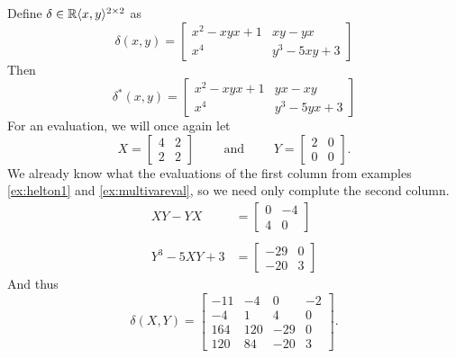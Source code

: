 \begin{example}
  Define \(\delta \in \mathbb{R} \langle x,y \rangle ^{2\times 2}\) as
  \[
    \delta(x,y) = \begin{bmatrix}
               x^2-xyx+1 & xy-yx \\
               x^4 & y^3-5xy+3
        \end{bmatrix}
  \]
  Then
  \[
    \delta^*(x,y) = \begin{bmatrix}
               x^2-xyx+1 & yx-xy \\
               x^4 & y^3-5yx+3
        \end{bmatrix}
  \]
  For an evaluation, we will once again let
  \[
    X = \begin{bmatrix} 4 &2\\2&2 \end{bmatrix}  \qquad \text{ and } \qquad Y =\begin{bmatrix} 2&0\\0&0 \end{bmatrix}.
  \]
  We already know what the evaluations of the first column from examples
  \ref{ex:helton1} and \ref{ex:multivareval}, so we need only complute the
  second column.
  \begin{align*}
    XY-YX &= \begin{bmatrix} 0&-4\\4&0 \end{bmatrix}  \\
    \\
    Y^3-5XY+3 &= \begin{bmatrix} -29&0\\-20&3 \end{bmatrix}
  \end{align*}
  And thus
  \[
    \delta(X,Y) =
    \begin{bmatrix}
      -11&-4&0&-2 \\
      -4&1&4&0 \\
      164&120&-29&0\\
      120&84&-20&3
    \end{bmatrix}.
  \]
\end{example}
